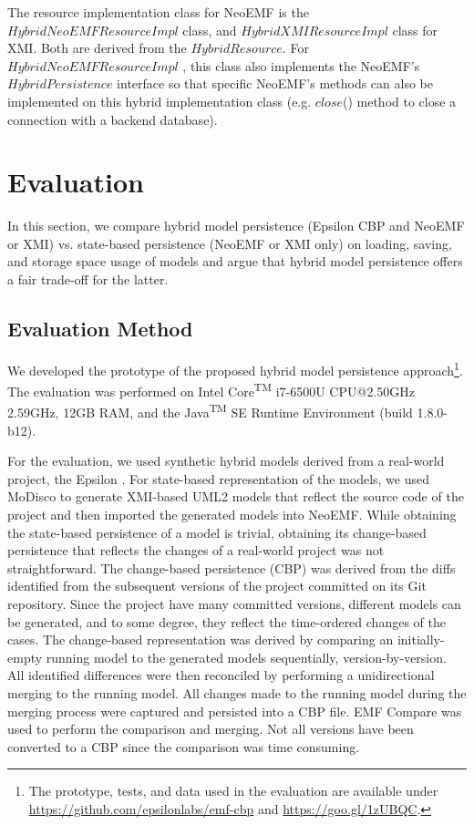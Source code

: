 \documentclass[10pt,conference]{IEEEtran}
\begin{document}
The resource implementation class for NeoEMF is the $HybridNeoEMFResourceImpl$ class, and $HybridXMIResource$$Impl$ class for XMI. Both are derived from the $HybridResource$. For $HybridNeoEMFResourceImpl$ , this class also implements the NeoEMF's $HybridPersistence$ interface so that specific NeoEMF's methods can also be implemented on this hybrid implementation class (e.g. $close$() method to close a connection with a backend database). 

\section{Evaluation}
\label{sec:evaluation}

In this section, we compare hybrid model persistence (Epsilon CBP and NeoEMF or XMI) vs. state-based persistence (NeoEMF or XMI only) on loading, saving, and storage space usage of models and argue that hybrid model persistence offers a fair trade-off for the latter. 

\subsection{Evaluation Method}
\label{sec:evaluation_method}
We developed the prototype of the proposed hybrid model persistence approach\footnote{The prototype, tests, and data used in the evaluation are available under \url{https://github.com/epsilonlabs/emf-cbp} and \url{https://goo.gl/1zUBQC}.}. The evaluation was performed on Intel\textsuperscript{\textregistered} Core\textsuperscript{TM} i7-6500U CPU@2.50GHz 2.59GHz, 12GB RAM, and the Java\textsuperscript{TM} SE Runtime Environment (build 1.8.0-b12).

For the evaluation, we used synthetic hybrid models derived from a real-world project, the Epsilon \cite{eclipse2017epsilon,eclipse2018epsilongit}. For state-based representation of the models, we used MoDisco \cite{DBLP:journals/infsof/BruneliereCDM14} to generate XMI-based UML2 \cite{eclipse2017uml2} models that reflect the source code of the project and then imported the generated models into NeoEMF. While obtaining the state-based persistence of a model is trivial, obtaining its change-based persistence that reflects the changes of a real-world project was not straightforward. The change-based persistence (CBP) was derived from the diffs identified from the subsequent versions of the project committed on its Git repository. Since the project have many committed versions, different models can be generated, and to some degree, they reflect the time-ordered changes of the cases. The change-based representation was derived by comparing an initially-empty running model to the generated models sequentially, version-by-version. All identified differences were then reconciled by performing a unidirectional merging to the running model. All changes made to the running model during the merging process were captured and persisted into a CBP file. EMF Compare was used \cite{eclipse2017compare} to perform the comparison and merging. Not all versions have been converted to a CBP since the comparison was time consuming.  
\end{document}
